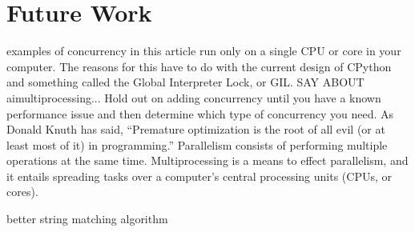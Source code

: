 \chapter{Future Work}
\label{sec:futurework}
\minitoc
\vspace*{1cm}

examples of concurrency in this article run only on a single CPU or core in your computer. The reasons for this have to do with the current design of CPython and something called the Global Interpreter Lock, or GIL. SAY ABOUT aimultiprocessing... Hold out on adding concurrency until you have a known performance issue and then determine which type of concurrency you need. As Donald Knuth has said, “Premature optimization is the root of all evil (or at least most of it) in programming.”
Parallelism consists of performing multiple operations at the same time. Multiprocessing is a means to effect parallelism, and it entails spreading tasks over a computer’s central processing units (CPUs, or cores). 

better string matching algorithm
